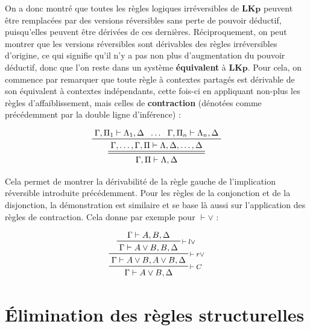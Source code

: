 \documentclass[11pt]{report}
\newcommand{\seq}{\vdash}
\newcommand{\irule}[1]{\footnotesize$#1$}
\newcommand{\iruleR}[1]{\irule{\seq{#1}}}
\begin{document}
On a donc montré que toutes les règles logiques irréversibles de $\mathbf{LKp}$ peuvent être remplacées par des versions réversibles sans perte de pouvoir déductif, puisqu'elles peuvent être dérivées de ces dernières. Réciproquement, on peut montrer que les versions réversibles sont dérivables des règles irréversibles d'origine, ce qui signifie qu'il n'y a pas non plus d'augmentation du pouvoir déductif, donc que l'on reste dans un système \textbf{équivalent} à $\mathbf{LKp}$. Pour cela, on commence par remarquer que toute règle à contextes partagés est dérivable de son équivalent à contextes indépendants, cette fois-ci en appliquant non-plus les règles d'affaiblissement, mais celles de \textbf{contraction} (dénotées comme précédemment par la double ligne d'inférence) :

\begin{displaymath}
    \prftree[d]
        {\prftree
            {\Gamma,\Pi_1 \seq \Lambda_1,\Delta}
            {\ldots}
            {\Gamma,\Pi_n \seq \Lambda_n,\Delta}
            {\Gamma,\ldots,\Gamma,\Pi \seq \Lambda,\Delta,\ldots,\Delta}}
        {\Gamma,\Pi \seq \Lambda,\Delta}
\end{displaymath}

Cela permet de montrer la dérivabilité de la règle gauche de l'implication réversible introduite précédemment. Pour les règles de la conjonction et de la disjonction, la démonstration est similaire et se base là aussi sur l'application des règles de contraction. Cela donne par exemple pour {\iruleR{\lor}} :

\begin{displaymath}
    \prftree[r]{\iruleR{C}}
        {\prftree[r]{\iruleR{r\lor}}
            {\prftree[r]{\iruleR{l\lor}}
                {\Gamma \seq A,B,\Delta}
                {\Gamma \seq A \lor B,B,\Delta}}
            {\Gamma \seq A \lor B,A \lor B,\Delta}}
        {\Gamma \seq A \lor B,\Delta}
\end{displaymath}

\chapter{Élimination des règles structurelles}
\end{document}
